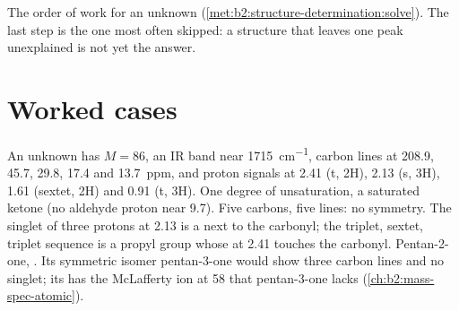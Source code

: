 \begin{omfigure}
\par\vspace{4pt}

{\small The order of work for an unknown (\cref{met:b2:structure-determination:solve}). The last step
is the one most often skipped: a structure that leaves one peak unexplained is not yet the answer.}
\end{omfigure}

\section{Worked cases}

\begin{example}[A ketone, C$_5$H$_{10}$O]\label{ex:b2:structure-determination:ketone}
An unknown has $M = 86$, an IR band near \qty{1715}{cm^{-1}}, carbon lines at 208.9, 45.7, 29.8, 17.4 and
13.7~ppm, and proton signals at 2.41 (t, 2H), 2.13 (s, 3H), 1.61 (sextet, 2H) and 0.91 (t, 3H).
One degree of unsaturation, a saturated ketone (no aldehyde proton near 9.7). Five carbons, five lines:
no symmetry. The singlet of three protons at 2.13 is a  next to the carbonyl; the triplet,
sextet, triplet sequence is a propyl group whose  at 2.41 touches the carbonyl. Pentan-2-one,
. Its symmetric isomer pentan-3-one would show three carbon lines and no singlet;
its  has the McLafferty ion at 58 that pentan-3-one lacks (\cref{ch:b2:mass-spec-atomic}).
\end{example}

